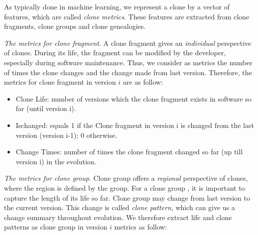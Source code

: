 
As typically done in machine learning, we represent a clone by a vector of features, which are called {\em clone metrics}. These features are extracted from clone fragments, clone groups and clone genealogies. 

{\em The metrics for clone fragment}. A clone fragment gives an {\em individual} perspective of clones. %
During its life, the fragment can be modified by the developer, especially during software maintenance. %
Thus, we consider as metrics the number of times the clone changes and the change made from last version. Therefore, the metrics for clone fragment in version $i$ are as follow:

\begin{itemize}
\setlength{\itemsep}{0pt}
\setlength{\parsep}{0pt}
\setlength{\parskip}{0pt}
\item {Clone Life}: number of versions which the clone fragment exists in software so far (until version i).
\item {Ischanged}:	equals 1 if the Clone fragment in version i is changed from the last version (version i-1); 0 otherwise.
\item {Change Times}:	number of times the clone fragment changed so far (up till version i) in the evolution.  
\end{itemize}

{\em The metrics for clone group}. Clone group offers a {\em regional} perspective of clones, where the region is defined by the group. %
For a clone group%
, it is important to capture the length of its life so far. %
Clone group may change from last version to the current version. This change is called {\em clone pattern}, %
which can give us a change summary throughout evolution. We therefore extract life and clone patterns as clone group  in version $i$ metrics as follow:

